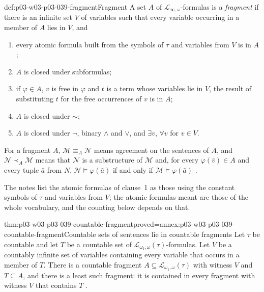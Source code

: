 \begin{hbdefinition}{def:p03-w03-p03-039-fragment}{Fragment}
A set \(A\) of \(\mathcal L_{\infty,\omega}\)-formulas is a \emph{fragment}
if there is an infinite set \(V\) of variables such that every variable
occurring in a member of \(A\) lies in \(V\), and
\begin{enumerate}
\item every atomic formula built from the symbols of \(\tau\) and variables
      from \(V\) is in \(A\);
\item \(A\) is closed under subformulas;
\item if \(\varphi\in A\), \(v\) is free in \(\varphi\) and \(t\) is a term
      whose variables lie in \(V\), the result of substituting \(t\) for the
      free occurrences of \(v\) is in \(A\);
\item \(A\) is closed under \({\sim}\);
\item \(A\) is closed under \(\neg\), binary \(\land\) and \(\lor\), and
      \(\exists v\), \(\forall v\) for \(v\in V\).
\end{enumerate}
For a fragment \(A\), \(\mathcal M\equiv_A\mathcal N\) means agreement on
the sentences of \(A\), and \(\mathcal N\prec_A\mathcal M\) means that
\(\mathcal N\) is a substructure of \(\mathcal M\) and, for every
\(\varphi(\bar v)\in A\) and every tuple \(\bar a\) from \(N\),
\(\mathcal N\models\varphi(\bar a)\) if and only if
\(\mathcal M\models\varphi(\bar a)\)
\cite[Def.~1.18, p.~9]{Marker2014InfinitaryNotes}.
\end{hbdefinition}

The notes list the atomic formulas of clause~1 as those using the constant
symbols of \(\tau\) and variables from \(V\); the atomic formulas meant are
those of the whole vocabulary, and the counting below depends on that.

\begin{hblemma}{thm:p03-w03-p03-039-countable-fragment}{proved=annex:p03-w03-p03-039-countable-fragment}{Countable sets of sentences lie in countable fragments}
Let \(\tau\) be countable and let \(T\) be a countable set of
\(\mathcal L_{\omega_1,\omega}(\tau)\)-formulas. Let \(V\) be a countably
infinite set of variables containing every variable that occurs in a member
of \(T\). There is a countable fragment \(A\subseteq\mathcal L_{\omega_1,\omega}(\tau)\)
with witness \(V\) and \(T\subseteq A\), and there is a least such fragment:
it is contained in every fragment with witness \(V\) that contains \(T\)
\cite[Ex.~1.19, p.~9]{Marker2014InfinitaryNotes}.
\end{hblemma}


